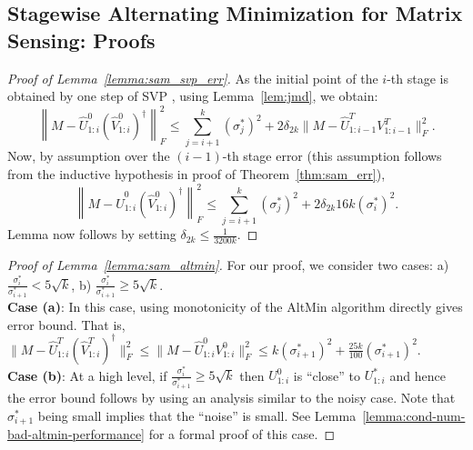 \documentclass[11pt]{article}
\theoremstyle{plain}
\theoremstyle{definition}
\newcommand{\aff}{{\mathcal A}}
\newcommand{\so}{\sigma^*}
\newcommand{\Vw}{\widehat{V}}
\newcommand{\Uw}{\widehat{U}}
\begin{document}
\subsection{Stagewise Alternating Minimization for Matrix Sensing: Proofs}\label{app:stagewise_sensing}
\begin{proof}[Proof of Lemma~\ref{lemma:sam_svp_err}]
As the initial point of the $i$-th stage is obtained by one step of SVP \cite{JainMD10}, using Lemma~\ref{lem:jmd}, we obtain:
$$\left\|M - \widehat{U}^0_{1:i}(\widehat{V}_{1:i}^0)^{\dag}\right\|_F^2 \leq \sum_{j=i+1}^k(\so_j)^2+2\delta_{2k}\|M-\Uw^T_{1:i-1}V^T_{1:i-1}\|_F^2.$$
Now, by assumption over the $(i-1)$-th stage error (this assumption follows from the inductive hypothesis in proof of Theorem~\ref{thm:sam_err}), 
$$\left\|M - \widehat{U}^0_{1:i}(\widehat{V}_{1:i}^0)^{\dag}\right\|_F^2 \leq \sum_{j=i+1}^k(\so_j)^2+2\delta_{2k} 16k(\so_i)^2.$$
Lemma now follows by setting $\delta_{2k}\leq \frac{1}{3200k}$. 
\end{proof}
\begin{proof}[Proof of Lemma~\ref{lemma:sam_altmin}]
For our proof, we consider two cases: a) $\frac{\so_i}{\so_{i+1}} < 5\sqrt{k}$, b) $\frac{\so_i}{\so_{i+1}} \geq 5\sqrt{k}$.\\
{\bf Case (a)}: In this case, using monotonicity of the AltMin algorithm directly gives error bound. That is, $\|M - \widehat{U}^T_{1:i}(\widehat{V}_{1:i}^T)^{\dag}\|_F^2\leq \|M-\Uw^0_{1:i}V^0_{1:i}\|_F^2 \leq k(\so_{i+1})^2+\frac{25k}{100}(\so_{i+1})^2.$\\%
{\bf Case (b)}: At a high level,  if $\frac{\so_i}{\so_{i+1}} \geq 5\sqrt{k}$ then $U^0_{1:i}$ is ``close'' to $U^*_{1:i}$ and hence the error bound follows by using an analysis similar to the noisy case. Note that $\so_{i+1}$ being small implies that the ``noise'' is small. See Lemma~\ref{lemma:cond-num-bad-altmin-performance} for a formal proof of this case. \hfill 
\end{proof}
\end{document}

